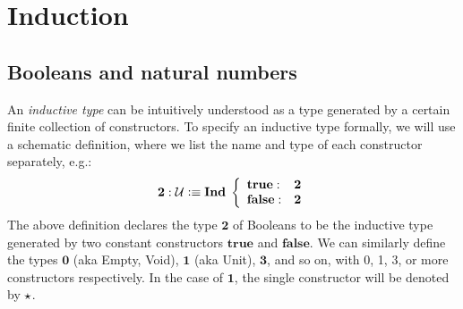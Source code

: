 \newcommand{\zero}{\ensuremath{\mathbf{0}}\xspace}
\newcommand{\one}{\ensuremath{\mathbf{1}}\xspace}
\newcommand{\two}{\ensuremath{\mathbf{2}}\xspace}
\newcommand{\twoh}{\ensuremath{\mathbf{2^h}}\xspace}
\newcommand{\three}{\ensuremath{\mathbf{3}}\xspace}
\newcommand{\natw}{\ensuremath{\mathbf{N^w}}\xspace}
\newcommand{\nath}{\ensuremath{\mathbf{N^h}}\xspace}
\newcommand{\lst}{\ensuremath{\mathbf{List}}\xspace}
\newcommand{\true}{\ensuremath{\mathbf{true}}\xspace}
\newcommand{\false}{\ensuremath{\mathbf{false}}\xspace}
\newcommand{\supp}{\ensuremath{\mathbf{sup}}\xspace}
\newcommand{\z}{\ensuremath{0}\xspace}
\newcommand{\zw}{\ensuremath{0^\mathbf{w}}\xspace}
\newcommand{\wtype}[1]{\ensuremath{W}(#1),\xspace}
\newcommand{\wtypeh}[1]{\ensuremath{W^h}(#1),\xspace}
\newcommand{\ind}{\ensuremath{\mathbf{Ind \;}}\xspace}
\newcommand{\s}{\ensuremath{\mathbf{s}}\xspace}
\newcommand{\sw}{\ensuremath{\mathbf{s^w}}\xspace}
\newcommand{\alt}{\;|\;\;}
\newcommand{\disj}[2]{#1 + #2}
\newcommand{\der}{\vdash}
\newcommand{\dbl}{\ensuremath{\mathbf{double}}}
\newcommand{\nalg}{\mathsf{\nat Alg}}
\newcommand{\nhom}{\mathsf{\nat Hom}}
\newcommand{\ishinitw}{\ensuremath{\mathsf{isHinit_W}}}
\newcommand{\ishinitn}{\ensuremath{\mathsf{isHinit_\nat}}}
\newcommand{\w}{\mathsf{W}}
\newcommand{\walg}{\mathsf{\w Alg}}
\newcommand{\whom}{\mathsf{\w Hom}}

\chapter{Induction}
\label{cha:induction}

\section{Booleans and natural numbers}
An \emph{inductive type} can be intuitively understood as a type generated by a certain finite collection of constructors. To specify an inductive type formally,
we will use a schematic definition, where we list the name and type of each constructor separately, e.g.:
\[ \two : \type \defeq \ind \left\{ 
\begin{array}{ll}
\true : &\two \\
\false : &\two
\end{array}
\right. \]     
The above definition declares the type $\two$ of Booleans to be the inductive type generated by two constant constructors $\true$ and $\false$. We can similarly define the types $\zero$ (aka Empty, Void), $\one$ (aka Unit), $\three$, and so on, with 0, 1, 3, or more constructors respectively. In the case of $\one$, the single constructor will be denoted by $\star$.

